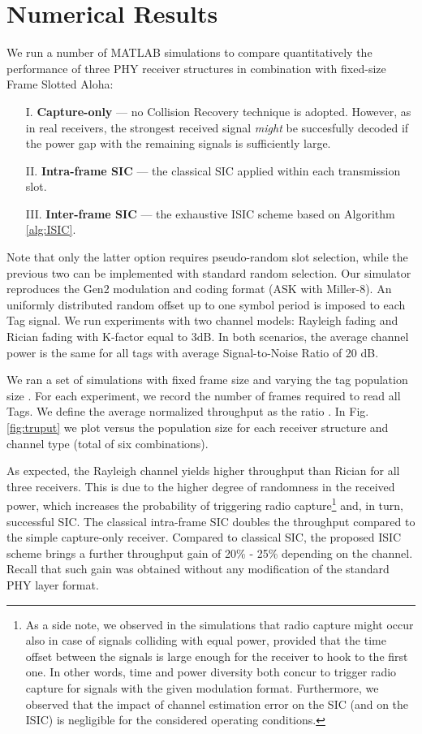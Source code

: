 \documentclass[12pt,draftcls,onecolumn]{IEEEtran}
\begin{document}
 \section{Numerical Results}
We run a number of MATLAB simulations to compare quantitatively the performance of three PHY receiver structures in combination with  fixed-size Frame Slotted Aloha:
\begin{itemize}
\item[  I.] {\bf{Capture-only}} --- no Collision Recovery technique is adopted. However, as in real receivers,  the strongest received signal \emph{might} be succesfully decoded if the power gap with the remaining signals is sufficiently large.
\item[ II.] {\bf Intra-frame SIC} --- the classical SIC applied within each transmission slot.
\item[III.] {\bf Inter-frame SIC} ---  the exhaustive ISIC scheme based on Algorithm \ref{alg:ISIC}.
\end{itemize}
Note that only the latter option requires pseudo-random slot selection, while the previous two can be implemented with standard random selection. Our simulator reproduces the Gen2 modulation and coding format (ASK with Miller-8). An uniformly distributed random offset up to one symbol period is imposed to each Tag signal.
We run experiments with two channel models: Rayleigh fading and Rician fading with K-factor equal to 3dB. In both scenarios, the average channel power is the same for all tags with average Signal-to-Noise Ratio of 20 dB.  

We ran a set of simulations with fixed frame size  and varying the tag population size . For each experiment, we record the number  of frames required to read all Tags. We define the average normalized throughput as the ratio . In Fig.\,\ref{fig:truput} we plot  versus the population size  for each receiver structure and channel type (total of six combinations).








As expected, the Rayleigh channel yields higher throughput than Rician for all three receivers.
This is due to the higher degree of  randomness in the received power,  which increases the probability of triggering radio capture\footnote{As a side note, we observed in the simulations that radio capture might occur also in case of signals colliding with equal power, provided that the time offset between the signals is large enough for the receiver to hook to the first one. In other words, time and power diversity both concur to trigger radio capture for signals with the given modulation format. {Furthermore,  we observed that the impact of channel estimation error on the SIC (and on the ISIC) is negligible for the considered operating conditions.}} and, in turn, successful  SIC.
The classical intra-frame SIC doubles the throughput compared to the simple capture-only receiver.
Compared to classical SIC, the proposed ISIC scheme brings a further throughput gain of 20\% - 25\% depending on the channel. Recall that such gain was obtained without any modification of the standard PHY layer format.
\end{document}
